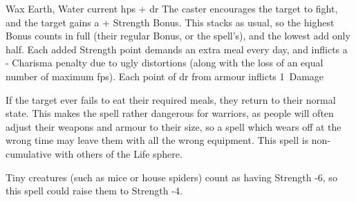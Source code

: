   {}%
  {Wax}%
  {Earth, Water}%
  {current \glspl{hp} + \gls{dr}}%
  {The caster encourages the target to fight, and the target gains a + Strength Bonus.
  This stacks as usual, so the highest Bonus counts in full (their regular Bonus, or the spell's), and the lowest add only half.
  Each added Strength point demands an extra meal every day, and inflicts a - Charisma penalty due to ugly distortions (along with the loss of an equal number of maximum \glspl{fp}).
  Each point of \gls{dr} from armour inflicts 1~Damage}%
  {
    If the target ever fails to eat their required meals, they return to their normal state.
    This makes the spell rather dangerous for warriors, as people will often adjust their weapons and armour to their size, so a spell which wears off at the wrong time may leave them with all the wrong equipment.
    This spell is non-cumulative with others of the Life sphere.

    Tiny creatures (such as mice or house spiders) count as having Strength -6, so this spell could raise them to Strength -4.
    }
